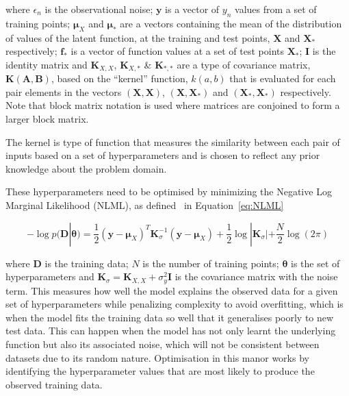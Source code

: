 \documentclass[12pt]{article}
\begin{document}
    \noindent where $\epsilon_n$ is the observational noise; $\mathbf{y}$ is a vector of $y_n$ values from a set of training points; $\boldsymbol{\mu}_X$ and $\boldsymbol{\mu}_*$ are a vectors containing the mean of the distribution of values of the latent function, at the training and test points, $\mathbf{X}$ and  $\mathbf{X}_*$ respectively; $\mathbf{f}_*$ is a vector of function values at a set of test points $\mathbf{X}_*$; $\mathbf{I}$ is the identity matrix and $\mathbf{K}_{X,X}$, $\mathbf{K}_{X,*}$ \& $\mathbf{K}_{*,*}$ are a type of covariance matrix, $\mathbf{K}(\mathbf{A},\mathbf{B})$, based on the ``kernel'' function, $k(a,b)$ that is evaluated for each pair elements in the vectors $(\mathbf{X},\mathbf{X})$, $(\mathbf{X},\mathbf{X}_*)$ and $(\mathbf{X}_*,\mathbf{X}_*)$ respectively.
    Note that block matrix notation is used where matrices are conjoined to form a larger block matrix.

    The kernel is type of function that measures the similarity between each pair of inputs based on a set of hyperparameters and is chosen to reflect any prior knowledge about the problem domain.

    These hyperparameters need to be optimised by minimizing the Negative Log Marginal Likelihood (NLML), as defined~\cite{murphy2023probabilistic} in Equation~\ref{eq:NLML}

    \begin{equation}
        -\log p(\mathbf{D}|\boldsymbol{\theta}) = \frac{1}{2} (\mathbf{y} - \boldsymbol{\mu}_X)^T \mathbf{K}_{\sigma}^{-1} (\mathbf{y} - \boldsymbol{\mu}_X) + \frac{1}{2} \log |\mathbf{K}_{\sigma}| + \frac{N}{2} \log(2\pi)\label{eq:NLML}
    \end{equation}


    \noindent where $\mathbf{D}$ is the training data; $N$ is the number of training points; $\boldsymbol{\theta}$ is the set of hyperparameters and $\mathbf{K}_{\sigma} = \mathbf{K}_{X,X} + \sigma^2_y \mathbf{I}$ is the covariance matrix with the noise term.
    This measures how well the model explains the observed data for a given set of hyperparameters while penalizing complexity to avoid overfitting, which is when the model fits the training data so well that it generalises poorly to new test data.
    This can happen when the model has not only learnt the underlying function but also its associated noise, which will not be consistent between datasets due to its random nature.
    Optimisation in this manor works by identifying the hyperparameter values that are most likely to produce the observed training data.
\end{document}
